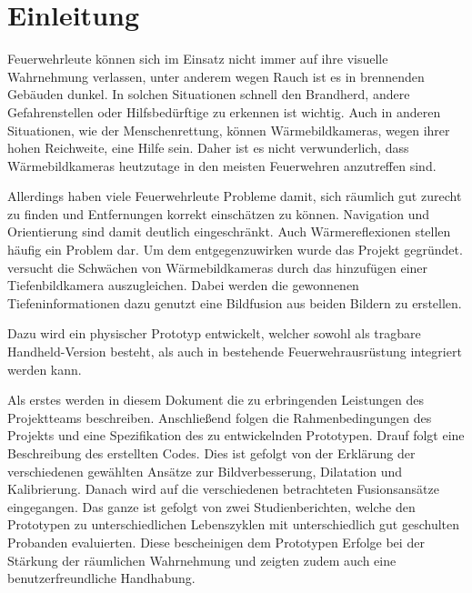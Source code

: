 
\chapter{Einleitung}
%
Feuerwehrleute können sich im Einsatz nicht immer auf ihre visuelle Wahrnehmung verlassen, unter anderem wegen Rauch ist es in brennenden Gebäuden dunkel.
In solchen Situationen schnell den Brandherd, andere Gefahrenstellen oder Hilfsbedürftige zu erkennen ist wichtig.
Auch in anderen Situationen, wie \zB der Menschenrettung, können Wärmebildkameras, wegen ihrer hohen Reichweite, eine Hilfe sein.
Daher ist es nicht verwunderlich, dass Wärmebildkameras heutzutage in den meisten Feuerwehren anzutreffen sind.

Allerdings haben viele Feuerwehrleute Probleme damit, sich räumlich gut zurecht zu finden und Entfernungen korrekt einschätzen zu können.
Navigation und Orientierung sind damit deutlich eingeschränkt.
Auch Wärmereflexionen stellen häufig ein Problem dar.
Um dem entgegenzuwirken wurde das Projekt \profire gegründet.
\profire versucht die Schwächen von Wärmebildkameras durch das hinzufügen einer Tiefenbildkamera auszugleichen.
Dabei werden die gewonnenen Tiefeninformationen dazu genutzt eine Bildfusion aus beiden Bildern zu erstellen.

Dazu wird ein physischer Prototyp entwickelt, welcher sowohl als tragbare Handheld-Version besteht, als auch in bestehende Feuerwehrausrüstung integriert werden kann.

Als erstes werden in diesem Dokument die zu erbringenden Leistungen des Projektteams beschreiben.
Anschließend folgen die Rahmenbedingungen des Projekts und eine Spezifikation des zu entwickelnden Prototypen.
Drauf folgt eine Beschreibung des erstellten Codes.
Dies ist gefolgt von der Erklärung der verschiedenen gewählten Ansätze zur Bildverbesserung, Dilatation und Kalibrierung.
Danach wird auf die verschiedenen betrachteten Fusionsansätze eingegangen.
Das ganze ist gefolgt von zwei Studienberichten, welche den Prototypen zu unterschiedlichen Lebenszyklen mit unterschiedlich gut geschulten Probanden evaluierten. 
Diese bescheinigen dem Prototypen Erfolge bei der Stärkung der räumlichen Wahrnehmung und zeigten zudem auch eine benutzerfreundliche Handhabung.

